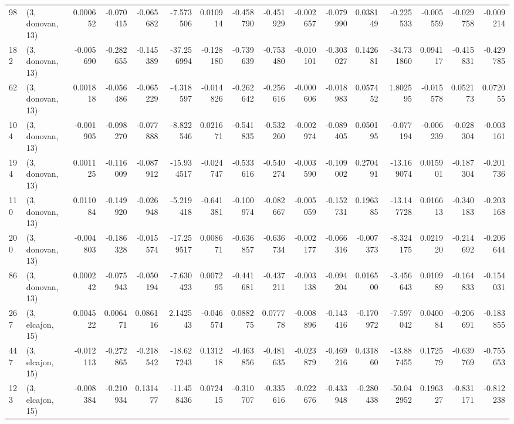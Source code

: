 \begin{tabular}{llrrrrrrrrrrrrrr}
98  &  (3, donovan, 13) &   0.000652 & -0.070415 & -0.065682 &   -7.573506 &  0.010914 &  -0.458790 & -0.451929 & -0.002657 & -0.079990 &  0.038149 &   -0.225533 & -0.005559 & -0.029758 & -0.009214 \\
182 &  (3, donovan, 13) &  -0.005690 & -0.282655 & -0.145389 &  -37.256994 & -0.128180 &  -0.739639 & -0.753480 & -0.010101 & -0.303027 &  0.142681 &  -34.731860 &  0.094117 & -0.415831 & -0.429785 \\
62  &  (3, donovan, 13) &   0.001818 & -0.056486 & -0.065229 &   -4.318597 & -0.014826 &  -0.262642 & -0.256616 & -0.000606 & -0.018983 &  0.057452 &    1.802595 & -0.015578 &  0.052173 &  0.072055 \\
104 &  (3, donovan, 13) &  -0.001905 & -0.098270 & -0.077888 &   -8.822546 &  0.021671 &  -0.541835 & -0.532260 & -0.002974 & -0.089405 &  0.050195 &   -0.077194 & -0.006239 & -0.028304 & -0.003161 \\
194 &  (3, donovan, 13) &   0.001125 & -0.116009 & -0.087912 &  -15.934517 & -0.024747 &  -0.533616 & -0.540274 & -0.003590 & -0.109002 &  0.270491 &  -13.169074 &  0.015901 & -0.187304 & -0.201736 \\
110 &  (3, donovan, 13) &   0.011084 & -0.149920 & -0.026948 &   -5.219418 & -0.641381 &  -0.100974 & -0.082667 & -0.005059 & -0.152731 &  0.196385 &  -13.147728 &  0.016613 & -0.340183 & -0.203168 \\
200 &  (3, donovan, 13) &  -0.004803 & -0.186328 & -0.015574 &  -17.259517 &  0.008671 &  -0.636857 & -0.636734 & -0.002177 & -0.066316 & -0.007373 &   -8.324175 &  0.021920 & -0.214692 & -0.206644 \\
86  &  (3, donovan, 13) &   0.000242 & -0.075943 & -0.050194 &   -7.630423 &  0.007295 &  -0.441681 & -0.437211 & -0.003138 & -0.094204 &  0.016500 &   -3.456643 &  0.010989 & -0.164833 & -0.154031 \\
267 &  (3, elcajon, 15) &   0.004522 &  0.006471 &  0.086116 &    2.142543 & -0.046574 &   0.088275 &  0.077778 & -0.008896 & -0.143416 & -0.170972 &   -7.597042 &  0.040084 & -0.206691 & -0.183855 \\
447 &  (3, elcajon, 15) &  -0.012113 & -0.272865 & -0.218542 &  -18.627243 &  0.131218 &  -0.463856 & -0.481635 & -0.023879 & -0.469216 &  0.431860 &  -43.887455 &  0.172579 & -0.639769 & -0.755653 \\
123 &  (3, elcajon, 15) &  -0.008384 & -0.210934 &  0.131477 &  -11.458436 &  0.072415 &  -0.310707 & -0.335616 & -0.022676 & -0.433948 & -0.280438 &  -50.042952 &  0.196327 & -0.831171 & -0.812238 \\

\end{tabular}

